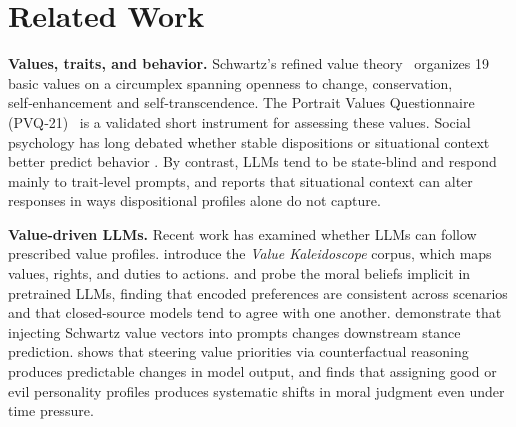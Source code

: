\documentclass[11pt]{article}
\begin{document}

\section{Related Work}
\label{sec:related}

\textbf{Values, traits, and behavior.}
Schwartz's refined value theory~\citep{schwartz2012refined} organizes 19 basic values on a circumplex spanning openness to change, conservation, self‑enhancement and self‑transcendence.
The Portrait Values Questionnaire (PVQ‑21)~\citep{schwartz2003proposal} is a validated short instrument for assessing these values. 
Social psychology has long debated whether stable dispositions or situational context better predict behavior \citep{mischel1968personality, ross1991person}.
By contrast, LLMs tend to be state‑blind and respond mainly to trait‑level prompts, and \citet{soni2025we} reports that situational context can alter responses in ways dispositional profiles alone do not capture.

\textbf{Value-driven LLMs.}
Recent work has examined whether LLMs can follow prescribed value profiles. \citet{sorensen2024value} introduce the \emph{Value Kaleidoscope} corpus, which maps values, rights, and duties to actions. \citet{abdulhai2023moral} and \citet{scherrer2023evaluating} probe the moral beliefs implicit in pretrained LLMs, finding that encoded preferences are consistent across scenarios and that closed-source models tend to agree with one another. 
\citet{kang2023values} demonstrate that injecting Schwartz value vectors into prompts changes downstream stance prediction. 
\citet{guo2026counterfactual} shows that steering value priorities via counterfactual reasoning produces predictable changes in model output, and \citet{jiao2025ai} finds that assigning good or evil personality profiles produces systematic shifts in moral judgment even under time pressure. 
\end{document}
